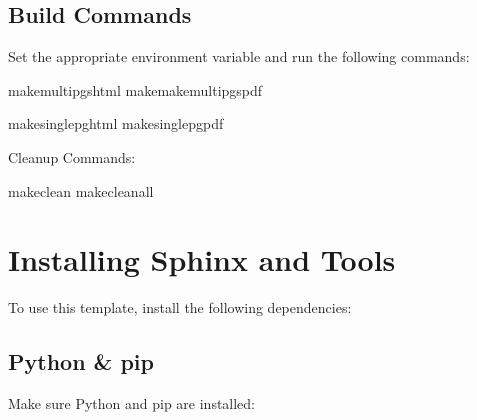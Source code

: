 \documentclass[letterpaper,11pt,oneside,english,openany,oneside]{sphinxmanual}
\begin{document}
\section{Build Commands}
\label{\detokenize{z02_usage:build-commands}}
\sphinxAtStartPar
Set the appropriate environment variable and run the following commands:

\sphinxAtStartPar
{}

\begin{sphinxVerbatim}[commandchars=\\\{\}]
makemulti\PYGZhy{}pgs\PYGZhy{}html
makemakemulti\PYGZhy{}pgs\PYGZhy{}pdf
\end{sphinxVerbatim}

\sphinxAtStartPar
{}

\begin{sphinxVerbatim}[commandchars=\\\{\}]
makesingle\PYGZhy{}pg\PYGZhy{}html
makesingle\PYGZhy{}pg\PYGZhy{}pdf
\end{sphinxVerbatim}

\sphinxAtStartPar
Cleanup Commands:

\begin{sphinxVerbatim}[commandchars=\\\{\}]
makeclean
makeclean\PYGZhy{}all
\end{sphinxVerbatim}

\sphinxstepscope


\chapter{Installing Sphinx and Tools}
\label{\detokenize{z03_installing_sphinx:installing-sphinx-and-tools}}\label{\detokenize{z03_installing_sphinx::doc}}
\sphinxAtStartPar
To use this template, install the following dependencies:


\section{Python \& pip}
\label{\detokenize{z03_installing_sphinx:python-pip}}
\sphinxAtStartPar
Make sure Python and pip are installed:
\end{document}
